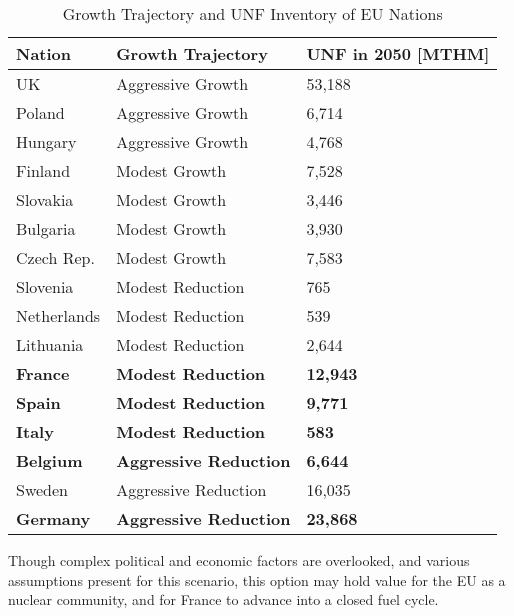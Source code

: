 \begin{table}[h]
    \centering
                \begin{tabularx}{\textwidth}{lbb}
                       \hline 
                    
                    \textbf{Nation} & \textbf{Growth Trajectory} & \small{\textbf{UNF in 2050 [MTHM] }}\\
                    \hline
                    UK & Aggressive Growth & 53,188\\
                    \hline
                    Poland & Aggressive Growth & 6,714\\
                    \hline
                    Hungary & Aggressive Growth & 4,768 \\ 
                    \hline
                    Finland & Modest Growth &  7,528\\
                    \hline
                    Slovakia & Modest Growth & 3,446\\
                    \hline
                    Bulgaria & Modest Growth & 3,930 \\
                    \hline
                    Czech Rep. & Modest Growth & 7,583\\
                    \hline
                    Slovenia & Modest Reduction & 765\\
                    \hline
                    Netherlands & Modest Reduction & 539\\
                    \hline
                    Lithuania & Modest Reduction & 2,644 \\
                    \hline
                    \textbf{France} & \textbf{Modest Reduction} & \textbf{12,943} \\
                    \hline 
                    \textbf{Spain} & \textbf{Modest Reduction} &  \textbf{9,771} \\
                    \hline
                    \textbf{Italy} & \textbf{Modest Reduction} & \textbf{583}\\
                    \hline
                    \textbf{Belgium} & \textbf{Aggressive Reduction} & \textbf{6,644}\\
                    \hline
                    Sweden & Aggressive Reduction & 16,035\\
                    \hline
                    \textbf{Germany} & \textbf{Aggressive Reduction} & \textbf{23,868}\\
                    \hline
                \end{tabularx}
    \caption {Growth Trajectory and UNF Inventory of \gls{EU} Nations}
    \label{tab:which_count}
\end{table}

Though complex political and economic factors are overlooked,
 and various assumptions present for this scenario,
this option may hold value for the \gls{EU} as a nuclear community,
and for France to advance into a closed fuel cycle.
